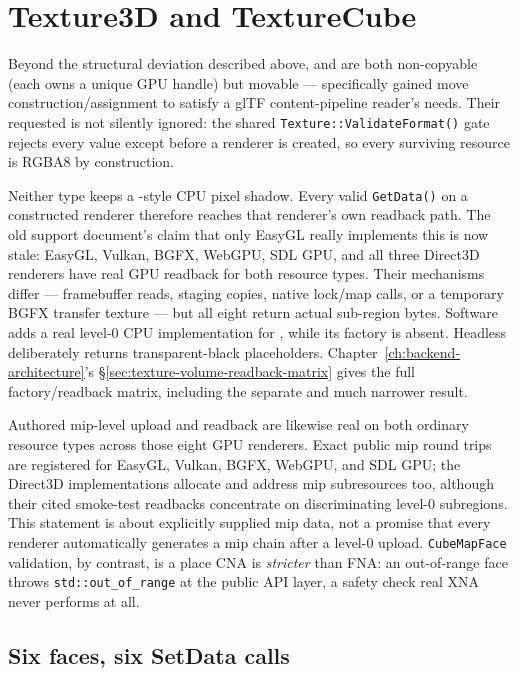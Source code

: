 \section{Texture3D and TextureCube}

Beyond the structural deviation described above,  and
 are both non-copyable (each owns a unique GPU handle) but movable ---
 specifically gained move construction/assignment to satisfy a glTF
content-pipeline reader's needs. Their requested  is not silently
ignored: the shared \texttt{Texture::ValidateFormat()} gate rejects every value except
 before a renderer is created, so every surviving resource is
RGBA8 by construction.

Neither type keeps a -style CPU pixel shadow. Every valid
\texttt{GetData()} on a constructed renderer therefore reaches that renderer's own readback
path. The old support document's claim that only EasyGL really implements this is now stale:
EasyGL, Vulkan, BGFX, WebGPU, SDL GPU, and all three Direct3D renderers have real GPU readback
for both resource types. Their mechanisms differ --- framebuffer reads, staging copies,
native lock/map calls, or a temporary BGFX transfer texture --- but all eight return actual
sub-region bytes. Software adds a real level-0 CPU implementation for
, while its  factory is absent. Headless deliberately
returns transparent-black placeholders. Chapter~\ref{ch:backend-architecture}'s
\S\ref{sec:texture-volume-readback-matrix} gives the full factory/readback matrix, including
the separate and much narrower  result.

Authored mip-level upload and readback are likewise real on both ordinary resource types
across those eight GPU renderers. Exact public mip round trips are registered for EasyGL,
Vulkan, BGFX, WebGPU, and SDL GPU; the Direct3D implementations allocate and address mip
subresources too, although their cited smoke-test readbacks concentrate on discriminating
level-0 subregions. This statement is about explicitly supplied mip data, not a promise that
every renderer automatically generates a mip chain after a level-0 upload.
\texttt{CubeMapFace} validation, by contrast, is a place CNA is \emph{stricter} than FNA: an
out-of-range face throws \texttt{std::out\_of\_range} at the public API layer, a safety check
real XNA never performs at all.

\subsection{Six faces, six SetData calls}

